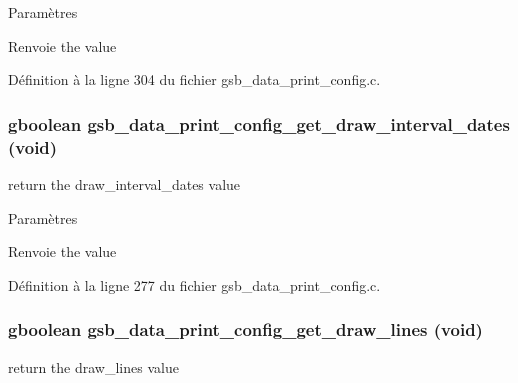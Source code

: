 \begin{DoxyParams}{Paramètres}
\item[{\em }]\end{DoxyParams}
\begin{DoxyReturn}{Renvoie}
the value 
\end{DoxyReturn}


Définition à la ligne 304 du fichier gsb\_\-data\_\-print\_\-config.c.

\subsubsection[{gsb\_\-data\_\-print\_\-config\_\-get\_\-draw\_\-interval\_\-dates}]{\setlength{\rightskip}{0pt plus 5cm}gboolean gsb\_\-data\_\-print\_\-config\_\-get\_\-draw\_\-interval\_\-dates (void)}\label{gsb__data__print__config_8h_a10c52e1083f665efc453c87daff007a7}
return the draw\_\-interval\_\-dates value


\begin{DoxyParams}{Paramètres}
\item[{\em }]\end{DoxyParams}
\begin{DoxyReturn}{Renvoie}
the value 
\end{DoxyReturn}


Définition à la ligne 277 du fichier gsb\_\-data\_\-print\_\-config.c.

\subsubsection[{gsb\_\-data\_\-print\_\-config\_\-get\_\-draw\_\-lines}]{\setlength{\rightskip}{0pt plus 5cm}gboolean gsb\_\-data\_\-print\_\-config\_\-get\_\-draw\_\-lines (void)}\label{gsb__data__print__config_8h_a6214f4edbeb618543155d93c1440fb13}
return the draw\_\-lines value


